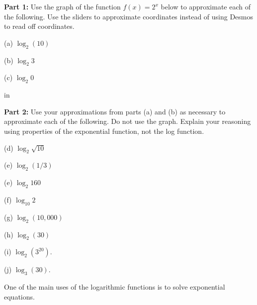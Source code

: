 \documentclass{ximera}
\newcommand{\pskip}{\vskip 0.1 in}
\begin{document}
\begin{question}  \label{Ex1:LogF}

{\bf Part 1:} Use the graph of the function $f(x)=2^x$ below to approximate each of the following. Use the sliders to approximate coordinates instead of using Desmos to read off coordinates.

(a) $\log_2 (10)$

(b) $\log_2 3$

(c) $\log_2 0$

\pskip

{\bf Part 2:} Use your approximations from parts (a) and (b) as necessary to approximate each of the following. Do not use the graph. Explain your reasoning using properties of the exponential function, not the log function.

(d) $\log_2 \sqrt{10}$

(e) $\log_2(1/3)$ 

(e)  $\log_2 160$ 

(f) $\log_{10} 2$ 

(g) $\log_2 (10,000)$

(h) $\log_2(30)$

(i) $\log_2(3^{20})$. 

(j) $\log_{3}(30)$.

\begin{exploration}
 
\begin{onlineOnly}
    \begin{center}
\end{center}
\end{onlineOnly}
\end{exploration}

\end{question}



One of the main uses of the logarithmic functions is to solve exponential equations.
\end{document}
